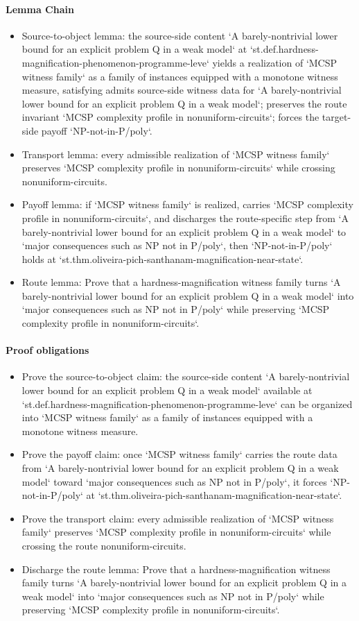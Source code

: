 \documentclass[11pt]{article}
\begin{document}
\paragraph{Lemma Chain}
\begin{itemize}
\item Source-to-object lemma: the source-side content `A barely-nontrivial lower bound for an explicit problem Q in a weak model` at `st.def.hardness-magnification-phenomenon-programme-leve` yields a realization of `MCSP witness family` as a family of instances equipped with a monotone witness measure, satisfying admits source-side witness data for `A barely-nontrivial lower bound for an explicit problem Q in a weak model`; preserves the route invariant `MCSP complexity profile in nonuniform-circuits`; forces the target-side payoff `NP-not-in-P/poly`.
\item Transport lemma: every admissible realization of `MCSP witness family` preserves `MCSP complexity profile in nonuniform-circuits` while crossing nonuniform-circuits.
\item Payoff lemma: if `MCSP witness family` is realized, carries `MCSP complexity profile in nonuniform-circuits`, and discharges the route-specific step from `A barely-nontrivial lower bound for an explicit problem Q in a weak model` to `major consequences such as NP not in P/poly`, then `NP-not-in-P/poly` holds at `st.thm.oliveira-pich-santhanam-magnification-near-state`.
\item Route lemma: Prove that a hardness-magnification witness family turns `A barely-nontrivial lower bound for an explicit problem Q in a weak model` into `major consequences such as NP not in P/poly` while preserving `MCSP complexity profile in nonuniform-circuits`.
\end{itemize}
\paragraph{Proof obligations}
\begin{itemize}
\item Prove the source-to-object claim: the source-side content `A barely-nontrivial lower bound for an explicit problem Q in a weak model` available at `st.def.hardness-magnification-phenomenon-programme-leve` can be organized into `MCSP witness family` as a family of instances equipped with a monotone witness measure.
\item Prove the payoff claim: once `MCSP witness family` carries the route data from `A barely-nontrivial lower bound for an explicit problem Q in a weak model` toward `major consequences such as NP not in P/poly`, it forces `NP-not-in-P/poly` at `st.thm.oliveira-pich-santhanam-magnification-near-state`.
\item Prove the transport claim: every admissible realization of `MCSP witness family` preserves `MCSP complexity profile in nonuniform-circuits` while crossing the route nonuniform-circuits.
\item Discharge the route lemma: Prove that a hardness-magnification witness family turns `A barely-nontrivial lower bound for an explicit problem Q in a weak model` into `major consequences such as NP not in P/poly` while preserving `MCSP complexity profile in nonuniform-circuits`.
\end{itemize}
\end{document}
